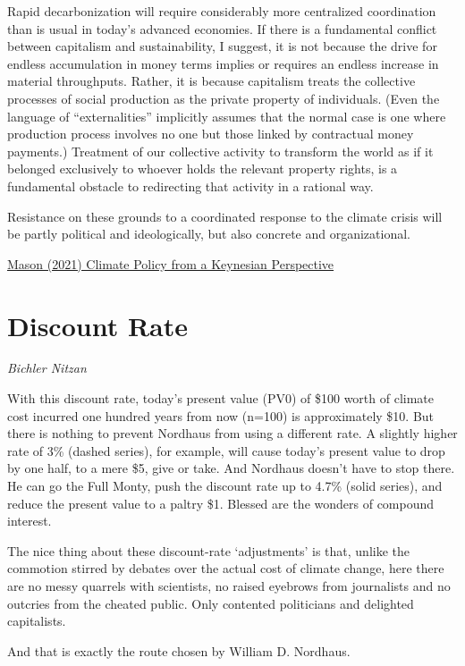 \documentclass[
]{book}
\begin{document}
Rapid decarbonization will require considerably more centralized coordination than is usual in today's advanced economies. If there is a fundamental conflict between capitalism and sustainability, I suggest, it is not because the drive for endless accumulation in money terms implies or requires an endless increase in material throughputs. Rather, it is because capitalism treats the collective processes of social production as the private property of individuals. (Even the language of ``externalities'' implicitly assumes that the normal case is one where production process involves no one but those linked by contractual money payments.) Treatment of our collective activity to transform the world as if it belonged exclusively to whoever holds the relevant property rights, is a fundamental obstacle to redirecting that activity in a rational way.

Resistance on these grounds to a coordinated response to the climate crisis will be partly political and ideologically, but also concrete and organizational.

\href{https://jwmason.org/slackwire/climate-policy-from-a-keynesian-perspective/}{Mason (2021) Climate Policy from a Keynesian Perspective}

\hypertarget{discount-rate}{%
\section{Discount Rate}\label{discount-rate}}

\emph{Bichler Nitzan}

With this discount rate, today's present value (PV0) of \$100 worth of climate cost incurred one hundred years from now (n=100) is approximately \$10. But there is nothing to prevent Nordhaus from using a different rate. A slightly higher rate of 3\% (dashed series), for example, will cause today's present value to drop by one half, to a mere \$5, give or take. And Nordhaus doesn't have to stop there. He can go the Full Monty, push the discount rate up to 4.7\% (solid series), and reduce the present value to a paltry \$1. Blessed are the wonders of compound interest.

The nice thing about these discount-rate `adjustments' is that, unlike the commotion stirred by debates over the actual cost of climate change, here there are no messy quarrels with scientists, no raised eyebrows from journalists and no outcries from the cheated public. Only contented politicians and delighted capitalists.

And that is exactly the route chosen by William D. Nordhaus.
\end{document}
